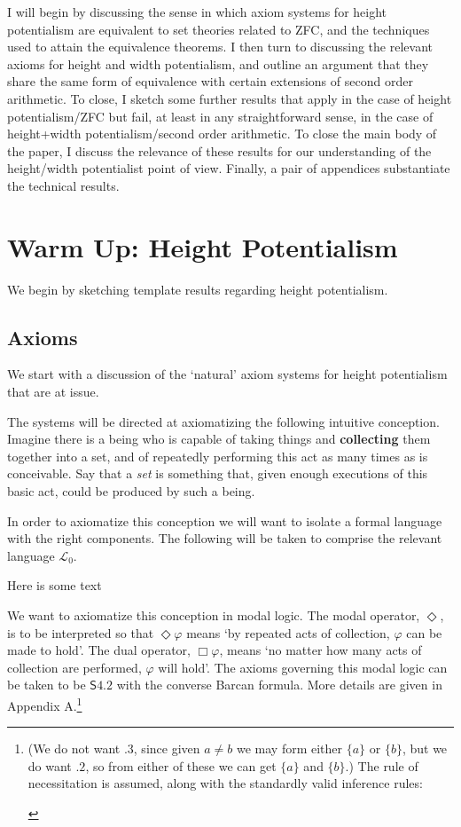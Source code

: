 \documentclass{article}
\begin{document}
I will begin by discussing the sense in which axiom systems for height potentialism
are equivalent to set theories related to ZFC, and the techniques used to attain 
the equivalence theorems. I then turn to discussing the relevant axioms 
for height and width 
potentialism, and outline an argument that they share the same form of equivalence with certain extensions 
of second order arithmetic. To close, I sketch some further results that apply in the 
case of height potentialism/ZFC but fail, at least in any straightforward sense, 
in the case of height+width potentialism/second order arithmetic. 
To close the main body of the paper, I discuss the relevance of these results for our understanding 
of the height/width potentialist point of view.
Finally, a pair of appendices substantiate the technical results.
\section{Warm Up: Height Potentialism}
We begin by sketching template results regarding height potentialism. 
\subsection{Axioms}
We start with a discussion of the `natural' axiom systems for height potentialism 
that are at issue.

The systems will be directed at axiomatizing the following 
intuitive conception. Imagine there is a being who is capable of taking things 
and {\bf collecting} them together into a set, and of repeatedly performing this act 
as many times as is conceivable. Say that a \emph{set} is something that, given enough 
executions of this basic act, could be produced by such a being. 

In order to axiomatize this conception we will want to isolate a formal language 
with the right components. The following will be taken to comprise the relevant 
language $\mathcal{L}_0$.

\begin{tcolorbox}
    Here is some text
\end{tcolorbox}

We want to axiomatize this conception in modal logic. The modal operator, $\Diamond$, 
is to be interpreted so that $\Diamond \varphi$ means
`by repeated acts of collection, $\varphi$ can be made to hold'. The dual 
operator, $\Box \varphi$, means `no matter how many acts of collection are performed, 
$\varphi$ will hold'. The axioms governing this modal logic can be taken to be 
$\mathsf{S4.2}$ with the converse Barcan formula. More details are given in Appendix A.\footnote{(We do not want $.3$, 
since given $a \not= b$ we may form either $\{a\}$ or $\{b\}$, but we do want 
$.2$,
so from either of these we can get $\{a\}$ and $\{b\}$.) The rule of necessitation 
is assumed, along with the standardly valid inference rules:
\begin{prooftree}
\end{prooftree}}
 
\end{document}
